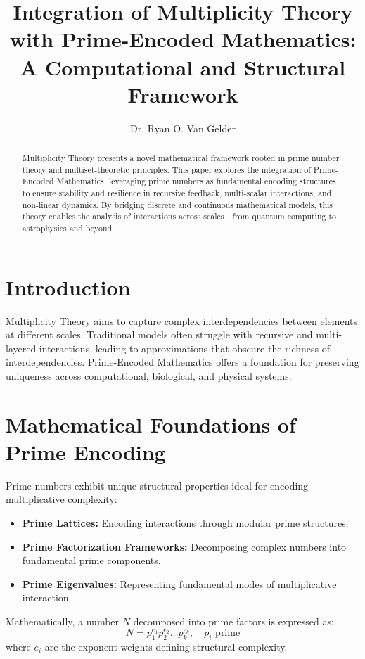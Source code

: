 \documentclass{article}
\begin{document}
\title{Integration of Multiplicity Theory with Prime-Encoded Mathematics: \newline A Computational and Structural Framework}
\author{Dr. Ryan O. Van Gelder}

\maketitle

\begin{abstract}
Multiplicity Theory presents a novel mathematical framework rooted in prime number theory and multiset-theoretic principles. This paper explores the integration of Prime-Encoded Mathematics, leveraging prime numbers as fundamental encoding structures to ensure stability and resilience in recursive feedback, multi-scalar interactions, and non-linear dynamics. By bridging discrete and continuous mathematical models, this theory enables the analysis of interactions across scales—from quantum computing to astrophysics and beyond.
\end{abstract}

\section{Introduction}
Multiplicity Theory aims to capture complex interdependencies between elements at different scales. Traditional models often struggle with recursive and multi-layered interactions, leading to approximations that obscure the richness of interdependencies. Prime-Encoded Mathematics offers a foundation for preserving uniqueness across computational, biological, and physical systems.

\section{Mathematical Foundations of Prime Encoding}
Prime numbers exhibit unique structural properties ideal for encoding multiplicative complexity:
\begin{itemize}
    \item \textbf{Prime Lattices:} Encoding interactions through modular prime structures.
    \item \textbf{Prime Factorization Frameworks:} Decomposing complex numbers into fundamental prime components.
    \item \textbf{Prime Eigenvalues:} Representing fundamental modes of multiplicative interaction.
\end{itemize}
Mathematically, a number \( N \) decomposed into prime factors is expressed as:
\begin{equation}
    N = p_1^{e_1} p_2^{e_2} \dots p_k^{e_k}, \quad p_i \text{ prime}
\end{equation}
where \( e_i \) are the exponent weights defining structural complexity.
\end{document}
